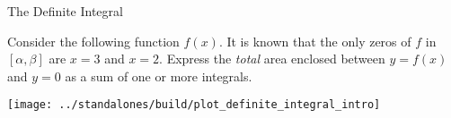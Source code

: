 \documentclass[../main.tex]{subfiles}
\begin{document}
\begin{lesson}{The Definite Integral}

  \begin{example}
    Consider the following function \(f(x)\).  It is known that the only zeros of \(f\) in \([\alpha, \beta]\) are \(x = 3\) and \(x = 2\). Express the \emph{total} area enclosed between \(y = f(x)\) and \(y = 0\) as a sum of one or more integrals.

    \texttt{[image: ../standalones/build/plot\_definite\_integral\_intro]}

  \end{example}

\end{lesson}
\end{document}
